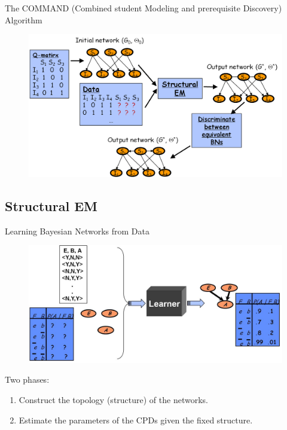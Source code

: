 \documentclass[hyperref={pdfpagelabels=false}]{beamer}
\begin{document}
\begin{frame}{The COMMAND (Combined student Modeling and prerequisite Discovery) Algorithm}
	\begin{figure}[h]
		\begin{center}
			\includegraphics[scale = .5]{figures/command.png}
		\end{center}
	\end{figure}
\end{frame}

\subsection{Structural EM}

\begin{frame}{Learning Bayesian Networks from Data}
\begin{figure}[h]
    \begin{center}
        \includegraphics[scale = .4]{figures/learningbn.jpg}
    \end{center}
\end{figure}
Two phases:
\begin{enumerate}
\item Construct the topology (structure) of the networks.
\item Estimate the parameters of the CPDs given the fixed structure.
\end{enumerate}
\end{frame}
\end{document}
